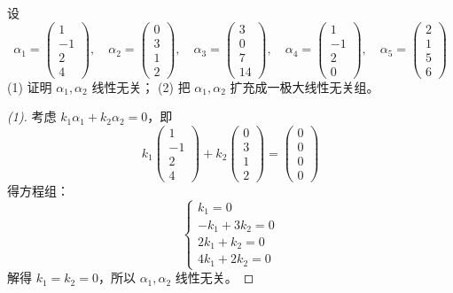 \documentclass[lang=cn,12pt]{elegantbook}
\begin{document}
\begin{example}
设
\[
\alpha_1 = \begin{pmatrix} 1 \\ -1 \\ 2 \\ 4 \end{pmatrix}, \quad 
\alpha_2 = \begin{pmatrix} 0 \\ 3 \\ 1 \\ 2 \end{pmatrix}, \quad 
\alpha_3 = \begin{pmatrix} 3 \\ 0 \\ 7 \\ 14 \end{pmatrix}, \quad 
\alpha_4 = \begin{pmatrix} 1 \\ -1 \\ 2 \\ 0 \end{pmatrix}, \quad 
\alpha_5 = \begin{pmatrix} 2 \\ 1 \\ 5 \\ 6 \end{pmatrix}
\]
(1) 证明 $\alpha_1, \alpha_2$ 线性无关；
(2) 把 $\alpha_1, \alpha_2$ 扩充成一极大线性无关组。
\end{example}

\begin{proof}[(1)]
考虑 $k_1\alpha_1 + k_2\alpha_2 = 0$，即
\[
k_1\begin{pmatrix} 1 \\ -1 \\ 2 \\ 4 \end{pmatrix} + k_2\begin{pmatrix} 0 \\ 3 \\ 1 \\ 2 \end{pmatrix} = \begin{pmatrix} 0 \\ 0 \\ 0 \\ 0 \end{pmatrix}
\]
得方程组：
\[
\begin{cases}
k_1 = 0 \\
-k_1 + 3k_2 = 0 \\
2k_1 + k_2 = 0 \\
4k_1 + 2k_2 = 0
\end{cases}
\]
解得 $k_1 = k_2 = 0$，所以 $\alpha_1, \alpha_2$ 线性无关。
\end{proof}
\end{document}
